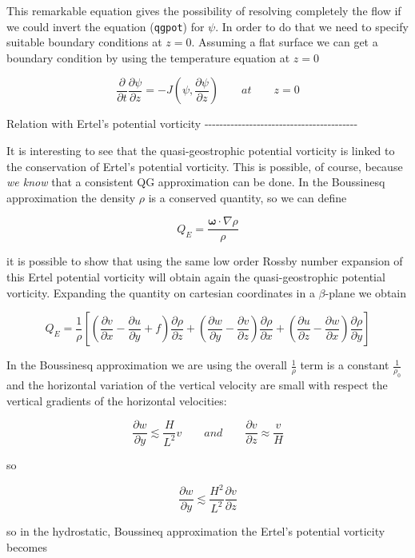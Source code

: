 This remarkable equation gives the possibility of resolving completely
the flow if we could invert the equation (\texttt{qgpot}) for \(\psi\).
In order to do that we need to specify suitable boundary conditions at
\(z=0\). Assuming a flat surface we can get a boundary condition by
using the temperature equation at \(z=0\)

{\[\frac{\partial }{\partial t}\frac{\partial \psi}{\partial z} = -J(\psi, \frac{\partial \psi}{\partial z}) \qquad  at  \qquad z=0\]}

\label{Sect:Ertel}
Relation with Ertel's potential vorticity
-\/-\/-\/-\/-\/-\/-\/-\/-\/-\/-\/-\/-\/-\/-\/-\/-\/-\/-\/-\/-\/-\/-\/-\/-\/-\/-\/-\/-\/-\/-\/-\/-\/-\/-\/-\/-\/-\/-\/-\/-

It is interesting to see that the quasi-geostrophic potential vorticity
is linked to the conservation of Ertel's potential vorticity. This is
possible, of course, because \emph{we know} that a consistent QG
approximation can be done. In the Boussinesq approximation the density
\(\rho\) is a conserved quantity, so we can define

\[Q_E = \frac{\mathbf{\omega}\cdot\nabla\rho}{\rho}\]

it is possible to show that using the same low order Rossby number
expansion of this Ertel potential vorticity will obtain again the
quasi-geostrophic potential vorticity. Expanding the quantity on
cartesian coordinates in a \(\beta\)-plane we obtain

\[Q_E = \frac{1}{\rho}\left[ \left( \frac{\partial v}{\partial x} - \frac{\partial u}{\partial y} +f \right)\frac{\partial \rho}{\partial z} + \left(\frac{\partial w}{\partial y} - \frac{\partial v}{\partial z}\right)\frac{\partial \rho}{\partial x} + \left( \frac{\partial u}{\partial z} - \frac{\partial w}{\partial x}\right)\frac{\partial \rho}{\partial y}\right]\]

In the Boussinesq approximation we are using the overall
\(\frac{1}{\rho}\) term is a constant \(\frac{1}{\rho_0}\) and the
horizontal variation of the vertical velocity are small with respect the
vertical gradients of the horizontal velocities:

\[\frac{\partial w}{\partial y} \lesssim \frac{H}{L^2} v  \qquad  and \qquad  \frac{\partial v}{\partial z} \approx \frac{v}{H}\]

so

\[\frac{\partial w}{\partial y} \lesssim \frac{H^2}{L^2} \frac{\partial v}{\partial z}\]

so in the hydrostatic, Boussineq approximation the Ertel's potential
vorticity becomes

